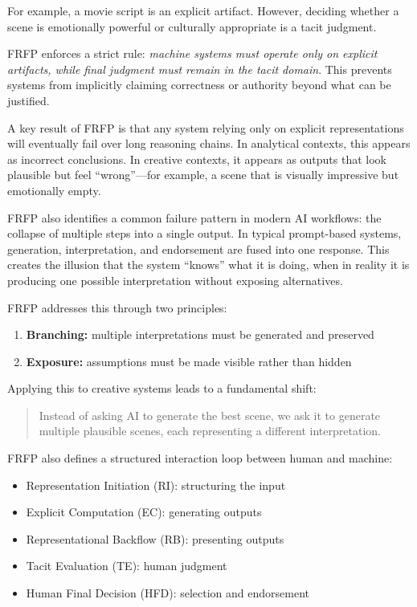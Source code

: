 \documentclass[preprints,article,submit,pdftex,moreauthors,accept]{Definitions/mdpi}
\begin{document}
For example, a movie script is an explicit artifact. However, deciding whether a scene is emotionally powerful or culturally appropriate is a tacit judgment.

FRFP enforces a strict rule: \emph{machine systems must operate only on explicit artifacts, while final judgment must remain in the tacit domain}. This prevents systems from implicitly claiming correctness or authority beyond what can be justified.

A key result of FRFP is that any system relying only on explicit representations will eventually fail over long reasoning chains. In analytical contexts, this appears as incorrect conclusions. In creative contexts, it appears as outputs that look plausible but feel ``wrong''—for example, a scene that is visually impressive but emotionally empty.

FRFP also identifies a common failure pattern in modern AI workflows: the collapse of multiple steps into a single output. In typical prompt-based systems, generation, interpretation, and endorsement are fused into one response. This creates the illusion that the system ``knows'' what it is doing, when in reality it is producing one possible interpretation without exposing alternatives.

FRFP addresses this through two principles:

\begin{enumerate}
    \item \textbf{Branching:} multiple interpretations must be generated and preserved
    \item \textbf{Exposure:} assumptions must be made visible rather than hidden
\end{enumerate}

Applying this to creative systems leads to a fundamental shift:

\begin{quote}
Instead of asking AI to generate the best scene, we ask it to generate multiple plausible scenes, each representing a different interpretation.
\end{quote}

FRFP also defines a structured interaction loop between human and machine:

\begin{itemize}
    \item Representation Initiation (RI): structuring the input
    \item Explicit Computation (EC): generating outputs
    \item Representational Backflow (RB): presenting outputs
    \item Tacit Evaluation (TE): human judgment
    \item Human Final Decision (HFD): selection and endorsement
\end{itemize}
\end{document}
